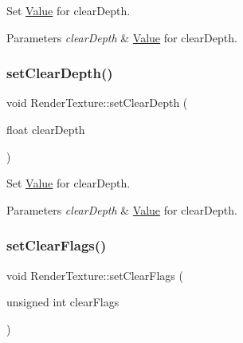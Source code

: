Set \hyperlink{classValue}{Value} for clear\+Depth.


\begin{DoxyParams}{Parameters}
{\em clear\+Depth} & \hyperlink{classValue}{Value} for clear\+Depth. \\
\hline
\end{DoxyParams}
\mbox{\label{classRenderTexture_a7e72dc0bbbbfd010ae3e568bd5675a6f}} 
\subsubsection{\texorpdfstring{set\+Clear\+Depth()}{setClearDepth()}\hspace{0.1cm}{\footnotesize\ttfamily [2/2]}}
{\footnotesize\ttfamily void Render\+Texture\+::set\+Clear\+Depth (\begin{DoxyParamCaption}\item[{float}]{clear\+Depth }\end{DoxyParamCaption})\hspace{0.3cm}{\ttfamily [inline]}}

Set \hyperlink{classValue}{Value} for clear\+Depth.


\begin{DoxyParams}{Parameters}
{\em clear\+Depth} & \hyperlink{classValue}{Value} for clear\+Depth. \\
\hline
\end{DoxyParams}
\mbox{\label{classRenderTexture_aa7614dfcc66334421283da912887eb42}} 
\subsubsection{\texorpdfstring{set\+Clear\+Flags()}{setClearFlags()}\hspace{0.1cm}{\footnotesize\ttfamily [1/2]}}
{\footnotesize\ttfamily void Render\+Texture\+::set\+Clear\+Flags (\begin{DoxyParamCaption}\item[{unsigned int}]{clear\+Flags }\end{DoxyParamCaption})\hspace{0.3cm}{\ttfamily [inline]}}


